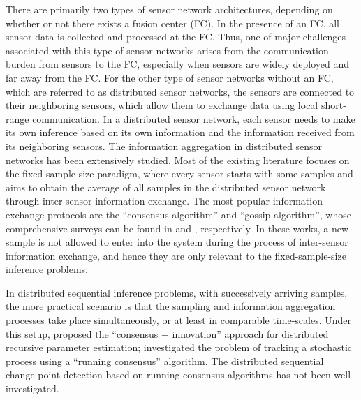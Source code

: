 \documentclass[11pt, draftclsnofoot, onecolumn]{IEEEtran}
\begin{document}
There are primarily two types of sensor network architectures, depending on whether or not there exists a fusion center (FC). In the presence of an FC, all sensor data is collected and processed at the FC. Thus, one of major challenges associated with this type of sensor networks arises from the communication burden from sensors to the FC, especially when sensors are widely deployed and far away from the FC. For the other type of sensor networks without an FC, which are referred to as distributed sensor networks, the sensors are connected to their neighboring sensors, which allow them to exchange data using local short-range communication. In a distributed sensor network, each sensor needs to make its own inference based on its own information and the information received from its neighboring sensors. The information aggregation in distributed sensor networks has been   extensively   studied. Most of the existing literature focuses on the fixed-sample-size paradigm, where every sensor starts with some samples and aims to obtain the average of all samples in the distributed sensor network through inter-sensor information exchange. The most popular information exchange protocols are the ``consensus algorithm'' and ``gossip algorithm'', whose comprehensive surveys can be found in \cite{olfati2007consensus} and \cite{dimakis2010gossip}, respectively. In these works, a new sample is not allowed to enter into the system during the process of inter-sensor information exchange, and hence they are only relevant to the fixed-sample-size inference problems.


In distributed sequential inference problems, with successively arriving samples, the more practical scenario is that the sampling and information aggregation processes take place simultaneously, or at least in comparable time-scales. Under this setup, \cite{kar2013consensus} proposed the ``consensus + innovation'' approach for distributed recursive parameter estimation; \cite{braca2008enforcing} investigated the problem of tracking a stochastic
process using a ``running consensus'' algorithm.   The distributed sequential change-point detection  based on running consensus algorithms has not been well investigated.  
\end{document}
